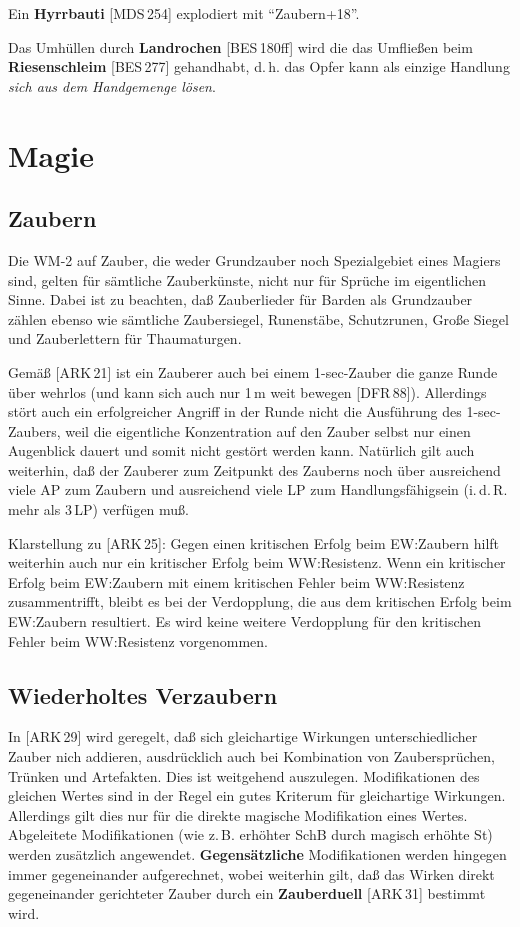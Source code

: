 \documentclass[10pt,a4paper,germanpar]{article}
\begin{document}
Ein \textbf{Hyrrbauti} [MDS\,254] explodiert mit "`Zaubern+18"'.

Das Umhüllen durch \textbf{Landrochen} [BES\,180ff] wird die das
Umfließen beim \textbf{Riesenschleim} [BES\,277] gehandhabt,
d.\,h. das Opfer kann als einzige Handlung \emph{sich aus dem
  Handgemenge lösen}.


\section{Magie}

\subsection{Zaubern}

Die WM-2 auf Zauber, die weder Grundzauber noch Spezialgebiet eines Magiers
sind, gelten für sämtliche Zauberkünste, nicht nur für Sprüche im eigentlichen
Sinne. Dabei ist zu beachten, daß Zauberlieder für Barden als Grundzauber
zählen ebenso wie sämtliche Zaubersiegel, Runenstäbe, Schutzrunen, Große
Siegel und Zauberlettern für Thaumaturgen.

Gemäß [ARK\,21] ist ein Zauberer auch bei einem 1-sec-Zauber die ganze Runde
über wehrlos (und kann sich auch nur 1\,m weit bewegen [DFR\,88]). Allerdings
stört auch ein erfolgreicher Angriff in der Runde nicht die Ausführung des
1-sec-Zaubers, weil die eigentliche Konzentration auf den Zauber selbst nur
einen Augenblick dauert und somit nicht gestört werden kann. Natürlich gilt
auch weiterhin, daß der Zauberer zum Zeitpunkt des Zauberns noch über
ausreichend viele AP zum Zaubern und ausreichend viele LP zum
Handlungsfähigsein (i.\,d.\,R. mehr als 3\,LP) verfügen muß.

Klarstellung zu [ARK\,25]: Gegen einen kritischen Erfolg beim EW:Zaubern
hilft weiterhin auch nur ein kritischer Erfolg beim WW:Resistenz. Wenn
ein kritischer Erfolg beim EW:Zaubern mit einem kritischen Fehler beim
WW:Resistenz zusammentrifft, bleibt es bei der Verdopplung, die aus
dem kritischen Erfolg beim EW:Zaubern resultiert. Es wird keine
weitere Verdopplung für den kritischen Fehler beim WW:Resistenz
vorgenommen.

\subsection{Wiederholtes Verzaubern}

In [ARK\,29] wird geregelt, daß sich gleichartige Wirkungen
unterschiedlicher Zauber nich addieren, ausdrücklich auch bei
Kombination von Zaubersprüchen, Trünken und Artefakten. Dies ist
weitgehend auszulegen. Modifikationen des gleichen Wertes sind in der
Regel ein gutes Kriterum für gleichartige Wirkungen. Allerdings gilt
dies nur für die direkte magische Modifikation eines
Wertes. Abgeleitete Modifikationen (wie z.\,B. erhöhter SchB durch
magisch erhöhte St) werden zusätzlich
angewendet. \textbf{Gegensätzliche} Modifikationen werden hingegen
immer gegeneinander aufgerechnet, wobei weiterhin gilt, daß das Wirken
direkt gegeneinander gerichteter Zauber durch ein \textbf{Zauberduell}
[ARK\,31] bestimmt wird.
\end{document}
